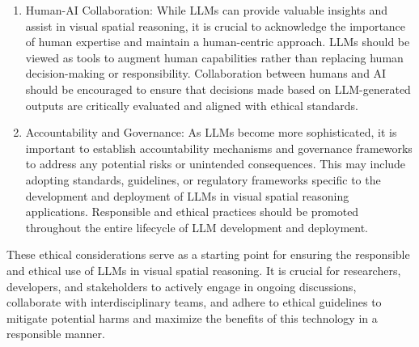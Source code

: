 \documentclass[journal,10pt]{IEEEtran}
\begin{document}
\begin{enumerate}
    \item Human-AI Collaboration: While LLMs can provide valuable insights and assist in visual spatial reasoning, it is crucial to acknowledge the importance of human expertise and maintain a human-centric approach. LLMs should be viewed as tools to augment human capabilities rather than replacing human decision-making or responsibility. Collaboration between humans and AI should be encouraged to ensure that decisions made based on LLM-generated outputs are critically evaluated and aligned with ethical standards.
    \item Accountability and Governance: As LLMs become more sophisticated, it is important to establish accountability mechanisms and governance frameworks to address any potential risks or unintended consequences. This may include adopting standards, guidelines, or regulatory frameworks specific to the development and deployment of LLMs in visual spatial reasoning applications. Responsible and ethical practices should be promoted throughout the entire lifecycle of LLM development and deployment.
\end{enumerate}
These ethical considerations serve as a starting point for ensuring the responsible and ethical use of LLMs in visual spatial reasoning. It is crucial for researchers, developers, and stakeholders to actively engage in ongoing discussions, collaborate with interdisciplinary teams, and adhere to ethical guidelines to mitigate potential harms and maximize the benefits of this technology in a responsible manner.
\end{document}
